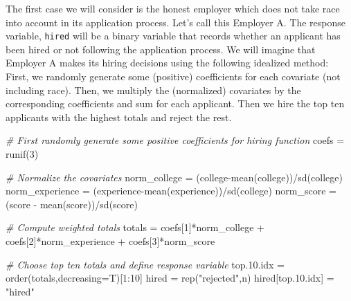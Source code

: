 \documentclass[
]{article}
\newenvironment{Shaded}{\begin{snugshade}}{\end{snugshade}}
\newcommand{\AttributeTok}[1]{\textcolor[rgb]{0.77,0.63,0.00}{#1}}
\newcommand{\CommentTok}[1]{\textcolor[rgb]{0.56,0.35,0.01}{\textit{#1}}}
\newcommand{\DecValTok}[1]{\textcolor[rgb]{0.00,0.00,0.81}{#1}}
\newcommand{\FloatTok}[1]{\textcolor[rgb]{0.00,0.00,0.81}{#1}}
\newcommand{\FunctionTok}[1]{\textcolor[rgb]{0.00,0.00,0.00}{#1}}
\newcommand{\NormalTok}[1]{#1}
\newcommand{\OtherTok}[1]{\textcolor[rgb]{0.56,0.35,0.01}{#1}}
\newcommand{\SpecialCharTok}[1]{\textcolor[rgb]{0.00,0.00,0.00}{#1}}
\newcommand{\StringTok}[1]{\textcolor[rgb]{0.31,0.60,0.02}{#1}}
\begin{document}
The first case we will consider is the honest employer which does not
take race into account in its application process. Let's call this
Employer A. The response variable, \texttt{hired} will be a binary
variable that records whether an applicant has been hired or not
following the application process. We will imagine that Employer A makes
its hiring decisions using the following idealized method: First, we
randomly generate some (positive) coefficients for each covariate (not
including race). Then, we multiply the (normalized) covariates by the
corresponding coefficients and sum for each applicant. Then we hire the
top ten applicants with the highest totals and reject the rest.

\begin{Shaded}
\begin{Highlighting}[]
 \CommentTok{\# First randomly generate some positive coefficients for hiring function}
\NormalTok{ coefs }\OtherTok{=} \FunctionTok{runif}\NormalTok{(}\DecValTok{3}\NormalTok{)}
 
 \CommentTok{\# Normalize the covariates }
\NormalTok{ norm\_college }\OtherTok{=}\NormalTok{ (college}\SpecialCharTok{{-}}\FunctionTok{mean}\NormalTok{(college))}\SpecialCharTok{/}\FunctionTok{sd}\NormalTok{(college)}
\NormalTok{ norm\_experience }\OtherTok{=}\NormalTok{ (experience}\SpecialCharTok{{-}}\FunctionTok{mean}\NormalTok{(experience))}\SpecialCharTok{/}\FunctionTok{sd}\NormalTok{(college) }
\NormalTok{ norm\_score }\OtherTok{=}\NormalTok{ (score }\SpecialCharTok{{-}} \FunctionTok{mean}\NormalTok{(score))}\SpecialCharTok{/}\FunctionTok{sd}\NormalTok{(score)}
 
 \CommentTok{\# Compute weighted totals}
\NormalTok{ totals }\OtherTok{=}\NormalTok{ coefs[}\DecValTok{1}\NormalTok{]}\SpecialCharTok{*}\NormalTok{norm\_college }\SpecialCharTok{+}\NormalTok{ coefs[}\DecValTok{2}\NormalTok{]}\SpecialCharTok{*}\NormalTok{norm\_experience }\SpecialCharTok{+}\NormalTok{ coefs[}\DecValTok{3}\NormalTok{]}\SpecialCharTok{*}\NormalTok{norm\_score}
 
 \CommentTok{\# Choose top ten totals and define response variable}
\NormalTok{ top.}\FloatTok{10.}\NormalTok{idx }\OtherTok{=} \FunctionTok{order}\NormalTok{(totals,}\AttributeTok{decreasing=}\NormalTok{T)[}\DecValTok{1}\SpecialCharTok{:}\DecValTok{10}\NormalTok{]}
\NormalTok{ hired }\OtherTok{=} \FunctionTok{rep}\NormalTok{(}\StringTok{"rejected"}\NormalTok{,n)}
\NormalTok{ hired[top.}\FloatTok{10.}\NormalTok{idx] }\OtherTok{=} \StringTok{"hired"}
\end{Highlighting}
\end{Shaded}
\end{document}
